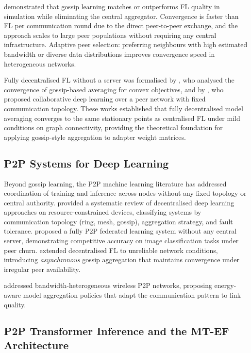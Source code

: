 \citet{HegeduisGossip2019} demonstrated that gossip learning matches or outperforms
FL quality in simulation while eliminating the central aggregator. Convergence is
faster than FL per communication round due to the direct peer-to-peer exchange,
and the approach scales to large peer populations without
requiring any central infrastructure. Adaptive peer selection: preferring neighbours
with high estimated bandwidth or diverse data distributions improves convergence
speed in heterogeneous networks.

Fully decentralised FL without a server was formalised by \citet{VanhaesebrouckDCL2017},
who analysed the convergence of gossip-based averaging for convex objectives, and by
\citet{JiangCollab2017}, who proposed collaborative deep learning over a peer network
with fixed communication topology. These works established that fully decentralised
model averaging converges to the same stationary points as centralised FL under mild
conditions on graph connectivity, providing the theoretical foundation for applying
gossip-style aggregation to adapter weight matrices.

\subsection{P2P Systems for Deep Learning}
\label{sec:p2p_federated:p2p_dl}

Beyond gossip learning, the P2P machine learning literature has addressed coordination
of training and inference across nodes without any fixed topology or central authority.
\citet{BellavistaDL2021} provided a systematic review of decentralised deep learning
approaches on resource-constrained devices, classifying systems by communication
topology (ring, mesh, gossip), aggregation strategy, and fault tolerance. \citet{WinkP2PFL2021}
proposed a fully P2P federated learning system without any central server, demonstrating
competitive accuracy on image classification tasks under peer churn. \citet{YeDecentralizedFL2022}
extended decentralised FL to unreliable network conditions, introducing
\textit{asynchronous} gossip aggregation that maintains convergence under irregular
peer availability.

\citet{Savazzi2020} addressed bandwidth-heterogeneous wireless P2P networks, proposing
energy-aware model aggregation policies that adapt the communication pattern to link
quality.

\subsection{P2P Transformer Inference and the MT-EF Architecture}
\label{sec:p2p_federated:p2p_transformer}

